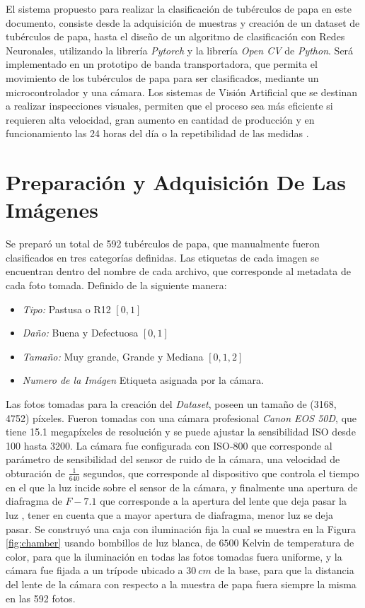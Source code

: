 El sistema propuesto para realizar la clasificación de tubérculos de papa en este documento, consiste desde la adquisición de muestras y creación de un dataset de tubérculos de papa, hasta el diseño de un algoritmo de clasificación con Redes Neuronales, utilizando la librería \textit{Pytorch} y la librería \textit{Open CV} de \textit{Python}. Será implementado en un prototipo de banda transportadora, que permita el movimiento de los tubérculos de papa para ser clasificados, mediante un microcontrolador y una cámara. Los sistemas de Visión Artificial que se destinan a realizar inspecciones visuales, permiten que el proceso sea más eficiente si requieren alta velocidad, gran aumento en cantidad de producción y en funcionamiento las 24 horas del día o la repetibilidad de las medidas \cite{artificial2012aplicacion}.


\section{Preparación y Adquisición De Las Imágenes}

Se preparó un total de 592 tubérculos de papa, que manualmente fueron clasificados en tres categorías definidas. Las etiquetas de cada imagen se encuentran dentro del nombre de cada archivo, que corresponde al metadata de cada foto tomada. Definido de la siguiente manera:

\begin{itemize}
	\item \textit{Tipo:} Pastusa o R12 $[0,1]$
	\item \textit{Daño:} Buena y Defectuosa $[0,1]$
	\item \textit{Tamaño:} Muy grande, Grande y Mediana $[0,1,2]$
	\item \textit{Numero de la Imágen} Etiqueta asignada por la cámara.
\end{itemize}	

Las fotos tomadas para la creación del \textit{Dataset}, poseen un tamaño de (3168, 4752) píxeles. Fueron tomadas con una cámara profesional \textit{Canon EOS 50D}, que tiene 15.1 megapíxeles de resolución y se puede ajustar la sensibilidad ISO desde 100 hasta 3200. La cámara fue configurada con ISO-800 que corresponde al parámetro de sensibilidad del sensor de ruido de la cámara, una velocidad de obturación de $\frac{1}{640}$ segundos, que corresponde al dispositivo que controla el tiempo en el que la luz incide sobre el sensor de la cámara, y finalmente una apertura de diafragma de $F-7.1$ que corresponde a la apertura del lente que deja pasar la luz \cite{Camara}, tener en cuenta que a mayor apertura de diafragma, menor luz se deja pasar. Se construyó una caja con iluminación fija la cual se muestra en la Figura \ref{fig:chamber} usando bombillos de luz blanca, de $6500$ Kelvin de temperatura de color, para que la iluminación en todas las fotos tomadas fuera uniforme, y la cámara fue fijada a un trípode ubicado a $30 \ cm$ de la base, para que la distancia del lente de la cámara con respecto a la muestra de papa fuera siempre la misma en las 592 fotos.

